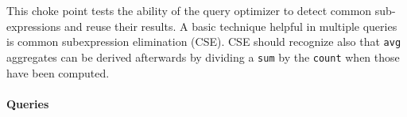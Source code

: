 
This choke point tests the ability of the query optimizer to detect common
sub-expressions and reuse their results. A basic technique helpful in multiple
queries is common subexpression elimination (CSE). CSE should recognize also
that \lstinline{avg} aggregates can be derived afterwards by dividing a
\lstinline{sum} by the \lstinline{count} when those have been computed.


\paragraph{Queries}
{\raggedright
}